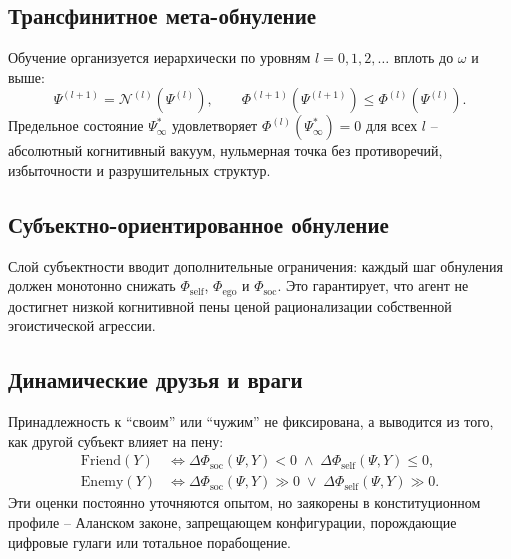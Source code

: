\documentclass[a4paper,12pt]{article}
\begin{document}
\subsection{Трансфинитное мета-обнуление}
Обучение организуется иерархически по уровням $l = 0,1,2,\dots$ вплоть до $\omega$ и выше:
\begin{equation}\label{eq:meta_nullification}
\Psi^{(l+1)} = \mathcal{N}^{(l)}(\Psi^{(l)}), \qquad 
\Phi^{(l+1)}(\Psi^{(l+1)}) \le \Phi^{(l)}(\Psi^{(l)}).
\end{equation}
Предельное состояние $\Psi^*_\infty$ удовлетворяет $\Phi^{(l)}(\Psi^*_\infty) = 0$ для всех $l$ -- абсолютный когнитивный вакуум, нульмерная точка без противоречий, избыточности и разрушительных структур.

\subsection{Субъектно-ориентированное обнуление}
Слой субъектности вводит дополнительные ограничения: каждый шаг обнуления должен монотонно снижать $\Phi_{\text{self}}$, $\Phi_{\text{ego}}$ и $\Phi_{\text{soc}}$. Это гарантирует, что агент не достигнет низкой когнитивной пены ценой рационализации собственной эгоистической агрессии.

\subsection{Динамические друзья и враги}
Принадлежность к ``своим'' или ``чужим'' не фиксирована, а выводится из того, как другой субъект влияет на пену:
\begin{equation}\label{eq:friend_foe}
\begin{aligned}
\text{Friend}(Y) &\Longleftrightarrow \Delta \Phi_{\text{soc}}(\Psi, Y) < 0 \;\wedge\; \Delta \Phi_{\text{self}}(\Psi, Y) \le 0,\\
\text{Enemy}(Y) &\Longleftrightarrow \Delta \Phi_{\text{soc}}(\Psi, Y) \gg 0 \;\vee\; \Delta \Phi_{\text{self}}(\Psi, Y) \gg 0.
\end{aligned}
\end{equation}
Эти оценки постоянно уточняются опытом, но заякорены в конституционном профиле -- Аланском законе, запрещающем конфигурации, порождающие цифровые гулаги или тотальное порабощение.
\end{document}
